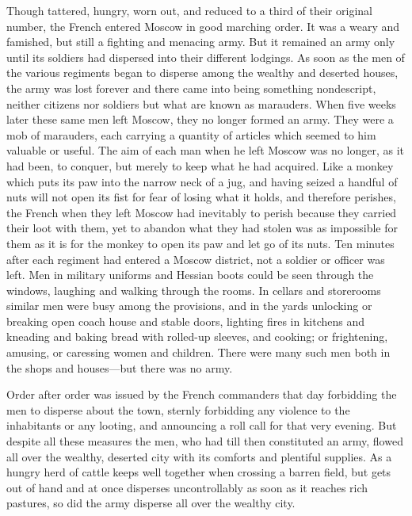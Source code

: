 Though tattered, hungry, worn out, and reduced to a third of
their original number, the French entered Moscow in good marching
order. It was a weary and famished, but still a fighting and
menacing army. But it remained an army only until its soldiers
had dispersed into their different lodgings. As soon as the men
of the various regiments began to disperse among the wealthy and
deserted houses, the army was lost forever and there came into
being something nondescript, neither citizens nor soldiers but
what are known as marauders. When five weeks later these same men
left Moscow, they no longer formed an army. They were a mob of
marauders, each carrying a quantity of articles which seemed to
him valuable or useful. The aim of each man when he left Moscow
was no longer, as it had been, to conquer, but merely to keep
what he had acquired. Like a monkey which puts its paw into the
narrow neck of a jug, and having seized a handful of nuts will
not open its fist for fear of losing what it holds, and therefore
perishes, the French when they left Moscow had inevitably to
perish because they carried their loot with them, yet to abandon
what they had stolen was as impossible for them as it is for the
monkey to open its paw and let go of its nuts. Ten minutes after
each regiment had entered a Moscow district, not a soldier or
officer was left. Men in military uniforms and Hessian boots
could be seen through the windows, laughing and walking through
the rooms. In cellars and storerooms similar men were busy among
the provisions, and in the yards unlocking or breaking open coach
house and stable doors, lighting fires in kitchens and kneading
and baking bread with rolled-up sleeves, and cooking; or
frightening, amusing, or caressing women and children. There were
many such men both in the shops and houses---but there was no
army.

Order after order was issued by the French commanders that day
forbidding the men to disperse about the town, sternly forbidding
any violence to the inhabitants or any looting, and announcing a
roll call for that very evening. But despite all these measures
the men, who had till then constituted an army, flowed all over
the wealthy, deserted city with its comforts and plentiful
supplies. As a hungry herd of cattle keeps well together when
crossing a barren field, but gets out of hand and at once
disperses uncontrollably as soon as it reaches rich pastures, so
did the army disperse all over the wealthy city.

